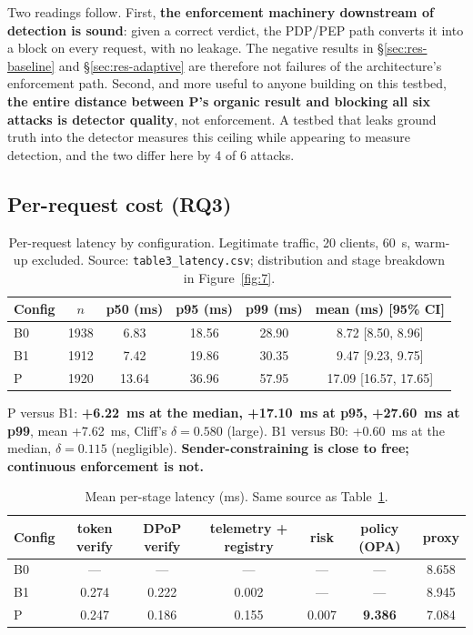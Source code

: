 Two readings follow. First, \textbf{the enforcement machinery downstream of detection is sound}: given a correct verdict, the PDP/PEP path converts it into a block on every request, with no leakage. The negative results in \S\ref{sec:res-baseline} and \S\ref{sec:res-adaptive} are therefore not failures of the architecture's enforcement path. Second, and more useful to anyone building on this testbed, \textbf{the entire distance between P's organic result and blocking all six attacks is detector quality}, not enforcement. A testbed that leaks ground truth into the detector measures this ceiling while appearing to measure detection, and the two differ here by 4 of 6 attacks.

\subsection{Per-request cost (RQ3)}
\label{sec:res-cost}

\setcounter{table}{7}
\begin{table}[t]
\centering
\caption{Per-request latency by configuration. Legitimate traffic, 20 clients, 60~s, warm-up excluded. Source: \texttt{table3\_latency.csv}; distribution and stage breakdown in Figure~\ref{fig:7}.}
\label{tab:8}
\small
\begin{tabular}{lccccc}
\toprule
Config & $n$ & p50 (ms) & p95 (ms) & p99 (ms) & mean (ms) [95\% CI] \\
\midrule
B0 & 1938 & 6.83 & 18.56 & 28.90 & 8.72 [8.50, 8.96] \\
B1 & 1912 & 7.42 & 19.86 & 30.35 & 9.47 [9.23, 9.75] \\
P & 1920 & 13.64 & 36.96 & 57.95 & 17.09 [16.57, 17.65] \\
\bottomrule
\end{tabular}
\end{table}

P versus B1: \textbf{+6.22~ms at the median, +17.10~ms at p95, +27.60~ms at p99}, mean +7.62~ms, Cliff's $\delta = 0.580$ (large). B1 versus B0: +0.60~ms at the median, $\delta = 0.115$ (negligible). \textbf{Sender-constraining is close to free; continuous enforcement is not.}

\setcounter{table}{8}
\begin{table}[t]
\centering
\caption{Mean per-stage latency (ms). Same source as Table~\ref{tab:8}.}
\label{tab:9}
\small
\begin{tabular}{lcccccc}
\toprule
Config & token verify & DPoP verify & telemetry + registry & risk & policy (OPA) & proxy \\
\midrule
B0 & --- & --- & --- & --- & --- & 8.658 \\
B1 & 0.274 & 0.222 & 0.002 & --- & --- & 8.945 \\
P & 0.247 & 0.186 & 0.155 & 0.007 & \textbf{9.386} & 7.084 \\
\bottomrule
\end{tabular}
\end{table}

